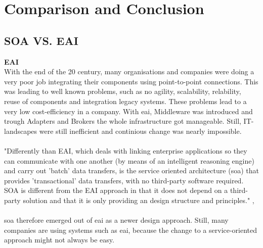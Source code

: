 \documentclass[12pt]{article}
\begin{document}
\newpage
\section{Comparison and Conclusion}
\subsection{SOA VS. EAI}
\textbf{EAI}\\
With the end of the 20 century, many organisations and companies were doing a very poor job integrating their components using point-to-point connections. This was leading to well known problems, such as no agility, scalability, relability, reuse of components and integration legacy systems. These problems lead to a very low cost-efficiency in a company. With \gls{eai}, Middleware was introduced and trough Adapters and Brokers the whole infrastructure got manageable. Still, IT-landscapes were still inefficient and continious change was nearly impossible. \cite[page 115]{te}
\\
\\
"Differently than EAI, which deals with linking enterprise applications so they can communicate with one another (by means of an intelligent reasoning engine) and carry out 'batch' data transfers, is the service oriented architecture (\gls{soa}) that provides 'transactional' data transfers, with no third-party software required. SOA is different from the EAI approach in that it does not depend on a third-party solution and that it is only providing an design structure and principles." ,\cite{soadef}\\
\\
\gls{soa} therefore emerged out of \gls{eai} as a newer design approach. Still, many companies are using systems such as \gls{eai}, because the change to a service-oriented approach might not always be easy. 
\end{document}
